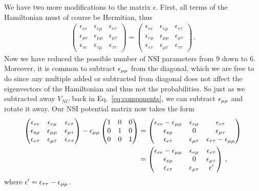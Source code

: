 \documentclass{thesis}
\begin{document}
We have two more modifications to the matrix $\epsilon$. First, all terms of the Hamiltonian must of course be Hermitian, thus
\begin{align}
    \begin{pmatrix}
        \epsilon_{ee} & \epsilon_{e\mu} & \epsilon_{e\tau}  \\
        \epsilon_{\mu e} & \epsilon_{\mu\mu} & \epsilon_{\mu\tau}  \\
        \epsilon_{\tau e} & \epsilon_{\tau\mu} & \epsilon_{\tau\tau}
    \end{pmatrix} =
    \begin{pmatrix}
        \epsilon_{ee} & \epsilon_{e\mu} & \epsilon_{e\tau}  \\
        \epsilon_{e \mu} & \epsilon_{\mu\mu} & \epsilon_{\mu\tau}  \\
        \epsilon_{e\tau} & \epsilon_{\mu\tau} & \epsilon_{\tau\tau}
    \end{pmatrix}\,.
\end{align}
Now we have reduced the possible number of NSI parameters from 9 down to 6. Moreover, it is common to subtract $\epsilon_{\mu\mu}$ from the diagonal, which
we are free to do since any multiple added or subtracted from diagonal does not affect the eigenvectors of the Hamiltonian and thus not the
probabilities. So just as we subtracted away $V_{NC}$ back in Eq.~\ref{eq:components}, we can subtract $\epsilon_{\mu\mu}$ and rotate it away.
Our NSI potential matrix now takes the form 
\begin{align}
    \begin{pmatrix}
        \epsilon_{ee} & \epsilon_{e\mu} & \epsilon_{e\tau}  \\
        \epsilon_{e \mu} & \epsilon_{\mu\mu} & \epsilon_{\mu\tau}  \\
        \epsilon_{e\tau} & \epsilon_{\mu\tau} & \epsilon_{\tau\tau}
    \end{pmatrix} 
    - \epsilon_{\mu\mu}
    \begin{pmatrix}
        1 & 0 & 0 \\
        0 & 1 & 0 \\
        0 & 0 & 1 
    \end{pmatrix}
     &= \begin{pmatrix}
        \epsilon_{ee}- \epsilon_{\mu\mu} & \epsilon_{e\mu} & \epsilon_{e\tau}  \\
        \epsilon_{e \mu} & 0 & \epsilon_{\mu\tau}  \\
        \epsilon_{e\tau} & \epsilon_{\mu\tau} & \epsilon_{\tau\tau} - \epsilon_{\mu\mu}
    \end{pmatrix} \nonumber \\
    &= \begin{pmatrix}
        \epsilon_{ee}- \epsilon_{\mu\mu} & \epsilon_{e\mu} & \epsilon_{e\tau}  \\
        \epsilon_{e \mu} & 0 & \epsilon_{\mu\tau}  \\
        \epsilon_{e\tau} & \epsilon_{\mu\tau} & \epsilon^\prime
    \end{pmatrix}\,,
\end{align}
where $\epsilon^\prime = \epsilon_{\tau\tau} - \epsilon_{\mu\mu}$.
\end{document}
